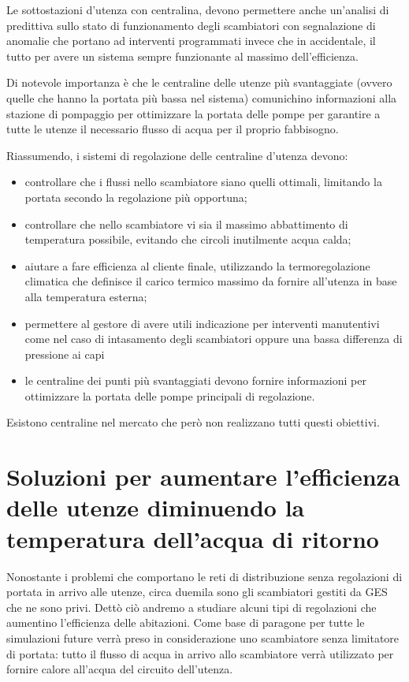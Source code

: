 \documentclass[laurea,oneside,11pt]{USiena_tesiLM}
\begin{document}

Le sottostazioni d'utenza con centralina, devono permettere anche un'analisi di predittiva sullo stato di funzionamento degli scambiatori con segnalazione di anomalie che portano ad interventi programmati invece che in accidentale, il tutto per avere un sistema sempre funzionante al massimo dell'efficienza.

Di notevole importanza è che le centraline delle utenze più svantaggiate (ovvero quelle che hanno la portata più bassa nel sistema) comunichino informazioni alla stazione di pompaggio per ottimizzare la portata delle pompe per garantire a tutte le utenze il necessario flusso di acqua per il proprio fabbisogno. 



Riassumendo, i sistemi di regolazione delle centraline d'utenza devono:
\begin{itemize}
\item controllare che i flussi nello scambiatore siano quelli ottimali, limitando la portata secondo la regolazione più opportuna;
\item controllare che nello scambiatore vi sia il massimo abbattimento di temperatura possibile, evitando che circoli inutilmente acqua calda;
\item aiutare a fare efficienza al cliente finale, utilizzando la termoregolazione climatica che definisce il carico termico massimo da fornire all'utenza in base alla temperatura esterna;
\item permettere al gestore di avere utili indicazione per interventi manutentivi come nel caso di intasamento degli scambiatori oppure una bassa differenza di pressione ai capi
\item le centraline dei punti più svantaggiati devono fornire informazioni per ottimizzare la portata delle pompe principali di regolazione.
\end{itemize}

Esistono centraline nel mercato che però non realizzano tutti questi obiettivi.

\section{Soluzioni per aumentare l'efficienza delle utenze diminuendo la temperatura dell'acqua di ritorno}
Nonostante i problemi che comportano le reti di distribuzione senza regolazioni di portata in arrivo alle utenze, circa duemila sono gli scambiatori gestiti da GES che ne sono privi.
Dettò ciò andremo a studiare alcuni tipi di regolazioni che aumentino l'efficienza delle abitazioni. 
Come base di paragone per tutte le simulazioni future verrà preso in considerazione uno scambiatore senza limitatore di portata: tutto il flusso di acqua in arrivo allo scambiatore verrà utilizzato per fornire calore all'acqua del circuito dell'utenza. 
\end{document}
